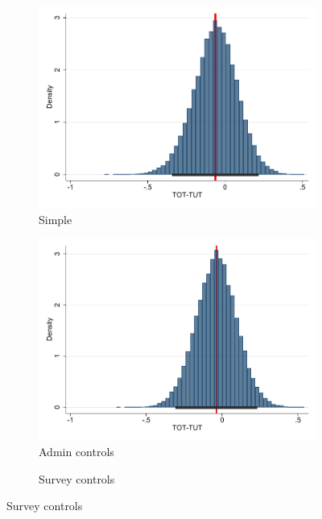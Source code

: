 \documentclass[oneside,11pt]{article}
\begin{document}
\begin{figure}[H]
    \caption{Bootstrap inference for the difference between TOT-TUT}
    \label{}
    \begin{center}
    \begin{subfigure}{0.45\textwidth}
        \caption{Simple}
        \centering
        \includegraphics[width=\textwidth]{Figuras/tot_tut_btsp1.pdf}
    \end{subfigure}
    \begin{subfigure}{0.45\textwidth}
        \caption{Admin controls}
        \centering
        \includegraphics[width=\textwidth]{Figuras/tot_tut_btsp2.pdf}
    \end{subfigure}
    \begin{subfigure}{0.45\textwidth}
        \caption{Survey controls}

\end{subfigure}
\end{center}
\end{figure}
\end{document}
